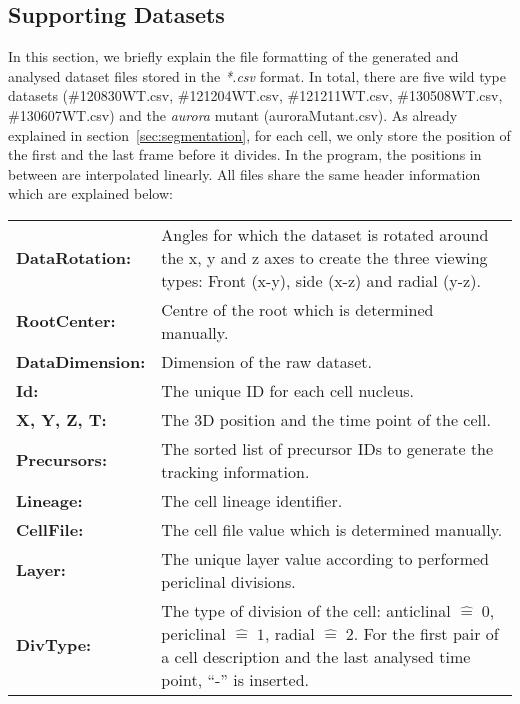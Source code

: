 \documentclass[11pt,a4paper, final]{article}
\begin{document}
\clearpage
\subsection{Supporting Datasets}
\label{sec:datasets}
\noindent
In this section, we briefly explain the file formatting of the generated and analysed dataset files stored in the \textit{*.csv} format. In total, there are five wild type datasets (\#120830WT.csv, \#121204WT.csv, \#121211WT.csv, \#130508WT.csv, \#130607WT.csv) and the \emph{aurora} mutant (auroraMutant.csv). As already explained in section~\ref{sec:segmentation}, for each cell, we only store the position of the first and the last frame before it divides. In the program, the positions in between are interpolated linearly. All files share the same header information which are explained below:

\noindent
\begin{tabularx}{\textwidth}{@{} >{\RaggedRight}p{2.8cm} X @{}}
\textbf{DataRotation:} &
Angles for which the dataset is rotated around the x, y and z axes to create the three viewing types: Front (x-y), side (x-z) and radial (y-z).\\
\textbf{RootCenter:} &
Centre of the root which is determined manually.\\
\textbf{DataDimension:} &
Dimension of the raw dataset.\\
\textbf{Id:} &
The unique ID for each cell nucleus.\\
\textbf{X, Y, Z, T:} &
The 3D position and the time point of the cell.\\
\textbf{Precursors:} &
The sorted list of precursor IDs to generate the tracking information.\\
\textbf{Lineage:} &
The cell lineage identifier.\\
\textbf{CellFile:} &
The cell file value which is determined manually.\\
\textbf{Layer:} &
The unique layer value according to performed periclinal divisions.\\
\textbf{DivType:} &
The type of division of the cell: anticlinal $\widehat{=} \; 0$, periclinal $\widehat{=} \; 1$, radial $\widehat{=} \; 2$. For the first pair of a cell description and the last analysed time point, ``-'' is inserted.\\
\end{tabularx}

\clearpage



\end{document}

